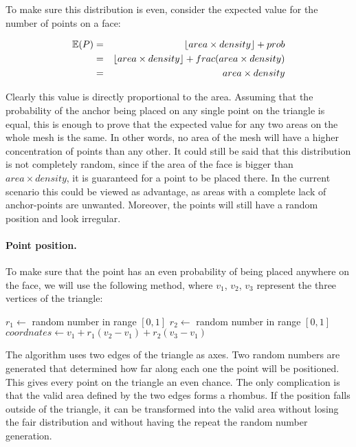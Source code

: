 \documentclass[a4paper, 12pt]{article}
\DeclarePairedDelimiter{\floor}{\lfloor}{\rfloor}
\begin{document}
\noindent
To make sure this distribution is even, consider the expected value for the number of points on a face:

\begin{eqnarray*}
\mathbb{E} (P) & = & \floor{area \times density} + prob \\
& = & \floor{area \times density} + frac(area \times density) \\
& = & area \times density
\end{eqnarray*}

\noindent
Clearly this value is directly proportional to the area. Assuming that the probability of the anchor being placed on any single point on the triangle is equal, this is enough to prove that the expected value for any two areas on the whole mesh is the same. In other words, no area of the mesh will have a higher concentration of points than any other. It could still be said that this distribution is not completely random, since if the area of the face is bigger than $area \times density$, it is guaranteed for a point to be placed there. In the current scenario this could be viewed as advantage, as areas with a complete lack of anchor-points are unwanted. Moreover, the points will still have a random position and look irregular.

\paragraph{Point position.}
To make sure that the point has an even probability of being placed anywhere on the face, we will use the following method, where $v_1$, $v_2$, $v_3$ represent the three vertices of the triangle:

\begin{algorithm}[H]
$r_1 \leftarrow$ random number in range $[0,1]$\;
$r_2 \leftarrow$ random number in range $[0,1]$\;
$coordnates \leftarrow v_1 + r_1(v_2-v_1) + r_2(v_3-v_1)$
\end{algorithm}

\noindent
The algorithm uses two edges of the triangle as axes. Two random numbers are generated that determined how far along each one the point will be positioned. This gives every point on the triangle an even chance. The only complication is that the valid area defined by the two edges forms a rhombus. If the position falls outside of the triangle, it can be transformed into the valid area without losing the fair distribution and without having the repeat the random number generation.
\end{document}
